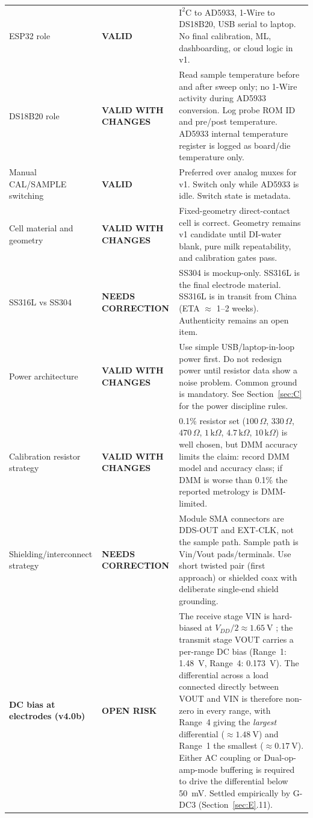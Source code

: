 \documentclass[11pt,a4paper]{article}
\newcommand{\kohm}[1]{\ensuremath{#1\,\mathrm{k}\Omega}}
\newcommand{\Rohm}[1]{\ensuremath{#1\,\Omega}}
\newcommand{\VALID}{\textcolor{EISGreen}{\textbf{VALID}}}
\newcommand{\VALIDCHANGES}{\textcolor{EISTeal}{\textbf{VALID WITH CHANGES}}}
\newcommand{\CORRECTION}{\textcolor{EISAmber}{\textbf{NEEDS CORRECTION}}}
\newcommand{\OPENRISK}{\textcolor{EISRed}{\textbf{OPEN RISK}}}
\begin{document}
\begin{xltabular}{\textwidth}{L{38mm}L{32mm}Y}
ESP32 role & \VALID & $\mathrm{I^2C}$ to AD5933, 1-Wire to DS18B20, USB serial to laptop. No final calibration, ML, dashboarding, or cloud logic in v1.\\
DS18B20 role & \VALIDCHANGES & Read sample temperature before and after sweep only; no 1-Wire activity during AD5933 conversion. Log probe ROM ID and pre/post temperature. AD5933 internal temperature register is logged as board/die temperature only.\\
Manual CAL/SAMPLE switching & \VALID & Preferred over analog muxes for v1. Switch only while AD5933 is idle. Switch state is metadata.\\
Cell material and geometry & \VALIDCHANGES & Fixed-geometry direct-contact cell is correct. Geometry remains v1 candidate until DI-water blank, pure milk repeatability, and calibration gates pass.\\
SS316L vs SS304 & \CORRECTION & SS304 is mockup-only. SS316L is the final electrode material. SS316L is in transit from China (ETA $\approx$ 1--2 weeks). Authenticity remains an open item.\\
Power architecture & \VALIDCHANGES & Use simple USB/laptop-in-loop power first. Do not redesign power until resistor data show a noise problem. Common ground is mandatory. See Section~\ref{sec:C} for the power discipline rules.\\
Calibration resistor strategy & \VALIDCHANGES & 0.1\% resistor set (\Rohm{100}, \Rohm{330}, \Rohm{470}, \kohm{1}, \kohm{4.7}, \kohm{10}) is well chosen, but DMM accuracy limits the claim: record DMM model and accuracy class; if DMM is worse than 0.1\% the reported metrology is DMM-limited.\\
Shielding/interconnect strategy & \CORRECTION & Module SMA connectors are DDS-OUT and EXT-CLK, not the sample path. Sample path is Vin/Vout pads/terminals. Use short twisted pair (first approach) or shielded coax with deliberate single-end shield grounding.\\
\textbf{DC bias at electrodes (v4.0b)} & \OPENRISK & The receive stage VIN is hard-biased at $V_{DD}/2 \approx \SI{1.65}{\volt}$ \cite{ad5933ds}; the transmit stage VOUT carries a per-range DC bias (Range~1: \SI{1.48}{\volt}, Range~4: \SI{0.173}{\volt}). The differential across a load connected directly between VOUT and VIN is therefore non-zero in every range, with Range~4 giving the \emph{largest} differential ($\approx\SI{1.48}{\volt}$) and Range~1 the smallest ($\approx\SI{0.17}{\volt}$). Either AC coupling or Dual-op-amp-mode buffering is required to drive the differential below \SI{50}{\milli\volt}. Settled empirically by G-DC3 (Section~\ref{sec:E}.11).\\

\end{xltabular}
\end{document}
